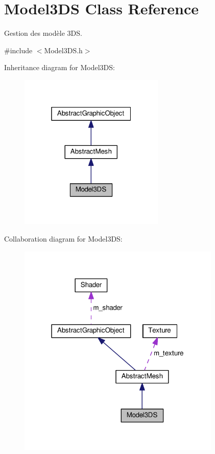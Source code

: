 \hypertarget{classModel3DS}{\section{Model3\+D\+S Class Reference}
\label{classModel3DS}
}


Gestion des modèle 3\+D\+S.  




{\ttfamily \#include $<$Model3\+D\+S.\+h$>$}



Inheritance diagram for Model3\+D\+S\+:\nopagebreak
\begin{figure}[H]
\begin{center}
\leavevmode
\includegraphics[width=196pt]{classModel3DS__inherit__graph}
\end{center}
\end{figure}


Collaboration diagram for Model3\+D\+S\+:\nopagebreak
\begin{figure}[H]
\begin{center}
\leavevmode
\includegraphics[width=274pt]{classModel3DS__coll__graph}
\end{center}
\end{figure}
